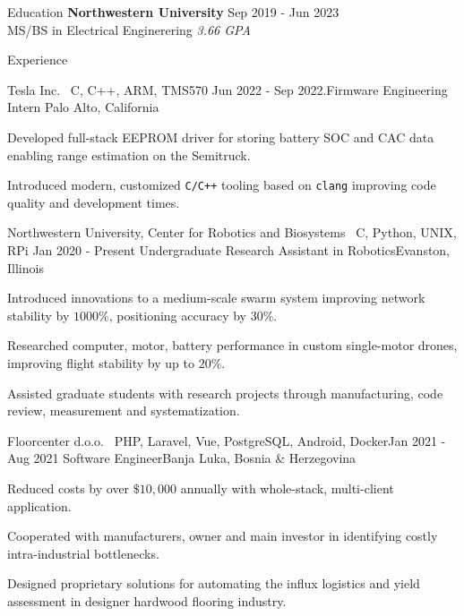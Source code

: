 \documentclass{resume}
\begin{document}
\begin{rSection}{Education}
    {\bf Northwestern University}
    \hfill {Sep 2019 - Jun 2023} \\ 
    MS/BS in Electrical Enginerering
    \hfill {\em 3.66 GPA}
\end{rSection}

\begin{rSection}{Experience}
    \begin{rSubsection}
        {Tesla Inc. \mid\ \textnormal{C, C++, ARM, TMS570}}
        {Jun 2022 - Sep 2022.}{Firmware Engineering Intern}
        {Palo Alto, California}
        \item Developed full-stack EEPROM driver for storing battery SOC and
            CAC data enabling range estimation on the Semitruck.
        \item Introduced modern, customized \texttt{C/C++} tooling based on
            \texttt{clang} improving code quality and development times.
    \end{rSubsection}
    \begin{rSubsection}
        {Northwestern University, Center for Robotics and Biosystems
         \mid\ \textnormal{C, Python, UNIX, RPi}
        }
        {Jan 2020 - Present}
        {Undergraduate Research Assistant in Robotics}{Evanston, Illinois}
        \item Introduced innovations to a medium-scale swarm system improving
            network stability by $1000\%$, positioning accuracy by $30\%$.
        \item Researched computer, motor, battery performance in custom
            single-motor drones, improving flight stability by up to $20\%$.
        \item Assisted graduate students with research projects through
            manufacturing, code review, measurement and systematization.
    \end{rSubsection}
    \begin{rSubsection}
        {Floorcenter d.o.o. \mid\ \textnormal{PHP, Laravel, Vue, PostgreSQL,
        Android, Docker}}{Jan 2021 - Aug 2021}
        {Software Engineer}{Banja Luka, Bosnia \& Herzegovina}
        \item Reduced costs by over $\$10,000$ annually with whole-stack,
            multi-client application.
        \item Cooperated with manufacturers, owner and main investor in
            identifying costly intra-industrial bottlenecks.
        \item Designed proprietary solutions for automating the influx logistics
            and yield assessment in designer hardwood flooring industry.
    \end{rSubsection}
\end{rSection}
\end{document}
